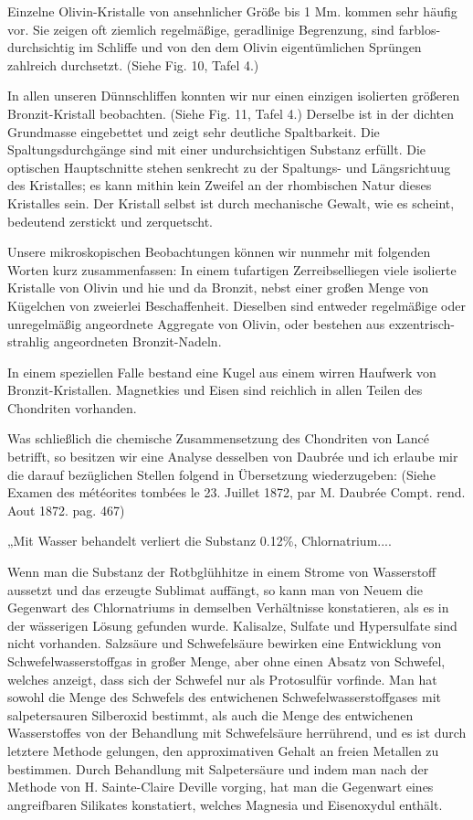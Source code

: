 \documentclass[a4paper, 11pt, oneside]{article}
\begin{document}
Einzelne Olivin-Kristalle von ansehnlicher Größe bis 1 Mm. kommen sehr häufig vor. Sie zeigen oft ziemlich regelmäßige, geradlinige Begrenzung, sind farblos-durchsichtig im Schliffe und von den dem Olivin eigentümlichen Sprüngen zahlreich durchsetzt. (Siehe Fig. 10, Tafel 4.)

In allen unseren Dünnschliffen konnten wir nur einen einzigen isolierten größeren Bronzit-Kristall beobachten. (Siehe Fig. 11, Tafel 4.) Derselbe ist in der dichten Grundmasse eingebettet und zeigt sehr deutliche Spaltbarkeit. Die Spaltungsdurchgänge sind mit einer undurchsichtigen Substanz erfüllt. Die optischen Hauptschnitte stehen senkrecht zu der Spaltungs- und Längsrichtuug des Kristalles; es kann mithin kein Zweifel an der rhombischen Natur dieses Kristalles sein. Der Kristall selbst ist durch mechanische Gewalt, wie es scheint, bedeutend zerstickt und zerquetscht.

Unsere mikroskopischen Beobachtungen können wir nunmehr mit folgenden Worten kurz zusammenfassen: In einem tufartigen Zerreibselliegen viele isolierte Kristalle von Olivin und hie und da Bronzit, nebst einer großen Menge von Kügelchen von zweierlei Beschaffenheit. Dieselben sind entweder regelmäßige oder unregelmäßig angeordnete Aggregate von Olivin, oder bestehen aus exzentrisch-strahlig angeordneten Bronzit-Nadeln.

In einem speziellen Falle bestand eine Kugel aus einem wirren Haufwerk von Bronzit-Kristallen. Magnetkies und Eisen sind reichlich in allen Teilen des Chondriten vorhanden.

Was schließlich die chemische Zusammensetzung des Chondriten von Lancé betrifft, so besitzen wir eine Analyse desselben von Daubrée und ich erlaube mir die darauf bezüglichen Stellen folgend in Übersetzung wiederzugeben: (Siehe Examen des météorites tombées le 23. Juillet 1872, par M. Daubrée Compt. rend. Aout 1872. pag. 467)

„Mit Wasser behandelt verliert die Substanz 0.12\%, Chlornatrium....

Wenn man die Substanz der Rotbglühhitze in einem Strome von Wasserstoff aussetzt und das erzeugte Sublimat auffängt, so kann man von Neuem die Gegenwart des Chlornatriums in demselben Verhältnisse konstatieren, als es in der wässerigen Lösung gefunden wurde. Kalisalze, Sulfate und Hypersulfate sind nicht vorhanden. Salzsäure und Schwefelsäure bewirken eine Entwicklung von Schwefelwasserstoffgas in großer Menge, aber ohne einen Absatz von Schwefel, welches anzeigt, dass sich der Schwefel nur als Protosulfür vorfinde. Man hat sowohl die Menge des Schwefels des entwichenen Schwefelwasserstoffgases mit salpetersauren Silberoxid bestimmt, als auch die Menge des entwichenen Wasserstoffes von der Behandlung mit Schwefelsäure herrührend, und es ist durch letztere Methode gelungen, den approximativen Gehalt an freien Metallen zu bestimmen. Durch Behandlung mit Salpetersäure und indem man nach der Methode von H. Sainte-Claire Deville vorging, hat man die Gegenwart eines angreifbaren Silikates konstatiert, welches Magnesia und Eisenoxydul enthält.
\end{document}
